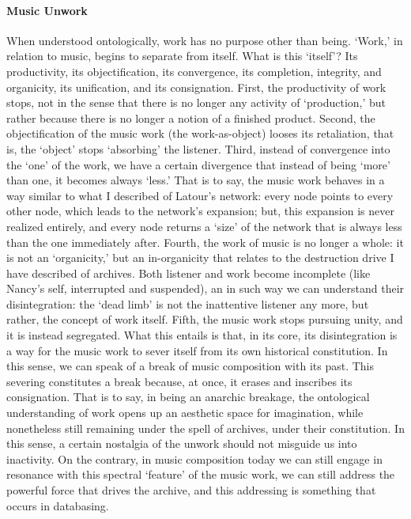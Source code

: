 \paragraph{Music Unwork}
When understood ontologically, work has no purpose other than being. `Work,' in relation to music, begins to separate from itself. What is this `itself'? Its productivity, its objectification, its convergence, its completion, integrity, and organicity, its unification, and its consignation. First, the productivity of work stops, not in the sense that there is no longer any activity of `production,' but rather because there is no longer a notion of a finished product. Second, the objectification of the music work (the work-as-object) looses its retaliation, that is, the `object' stops `absorbing' the listener. Third, instead of convergence into the `one' of the work, we have a certain divergence that instead of being `more' than one, it becomes always `less.' That is to say, the music work behaves in a way similar to what I described of Latour's network: every node points to every other node, which leads to the network's expansion; but, this expansion is never realized entirely, and every node returns a `size' of the network that is always less than the one immediately after. Fourth, the work of music is no longer a whole: it is not an `organicity,' but an in-organicity that relates to the destruction drive I have described of archives. Both listener and work become incomplete (like Nancy's self, interrupted and suspended), an in such way we can understand their disintegration: the `dead limb' is not the inattentive listener any more, but rather, the concept of work itself. Fifth, the music work stops pursuing unity, and it is instead segregated. What this entails is that, in its core, its disintegration is a way for the music work to sever itself from its own historical constitution. In this sense, we can speak of a break of music composition with its past. This severing constitutes a break because, at once, it erases and inscribes its consignation. That is to say, in being an anarchic breakage, the ontological understanding of work opens up an aesthetic space for imagination, while nonetheless still remaining under the spell of archives, under their constitution. In this sense, a certain nostalgia of the unwork should not misguide us into inactivity. On the contrary, in music composition today we can still engage in resonance with this spectral `feature' of the music work, we can still address the powerful force that drives the archive, and this addressing is something that occurs in databasing.

